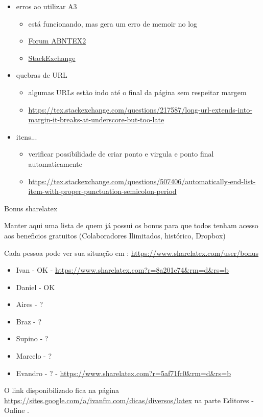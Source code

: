 \begin{itemize}
\item erros ao utilizar A3
    \begin{itemize}
        \item está funcionando, mas gera um erro de memoir no log
        \item \href{https://groups.google.com/forum/#!topic/abntex2/RJiyzb8JrMw}{Forum ABNTEX2}
        \item \href{https://tex.stackexchange.com/questions/179910/how-to-set-margins-in-a3-page-when-using-the-komaoptions-command-inside-an-a4-do}{StackExchange}
    \end{itemize}


\item quebras de URL
    \begin{itemize}
        \item algumas URLs estão indo até o final da página sem respeitar margem
        \item \url{https://tex.stackexchange.com/questions/217587/long-url-extends-into-margin-it-breaks-at-underscore-but-too-late}
    \end{itemize}

\item itens...
   \begin{itemize}
       \item verificar possibilidade de criar ponto e virgula e ponto final automaticamente
       \item \url{https://tex.stackexchange.com/questions/507406/automatically-end-list-item-with-proper-punctuation-semicolon-period}
   \end{itemize}

\end{itemize}





\pagebreak

Bonus sharelatex

Manter aqui uma lista de quem já possui os bonus para que todos tenham acesso aos beneficios gratuitos (Colaboradores Ilimitados, histórico, Dropbox)

Cada pessoa pode ver sua situação em : \url{https://www.sharelatex.com/user/bonus}


\begin{itemize}
\item Ivan - OK - \url{https://www.sharelatex.com?r=8a201e74&rm=d&rs=b}
\item Daniel - OK
\item Aires - ?
\item Braz - ?
\item Supino - ?
\item Marcelo - ?
\item Evandro - ? - \url{https://www.sharelatex.com?r=5af71fc0&rm=d&rs=b}
\end{itemize}

O link disponibilizado fica na página \url{https://sites.google.com/a/ivanfm.com/dicas/diversos/latex} na parte Editores - Online .

\pagebreak